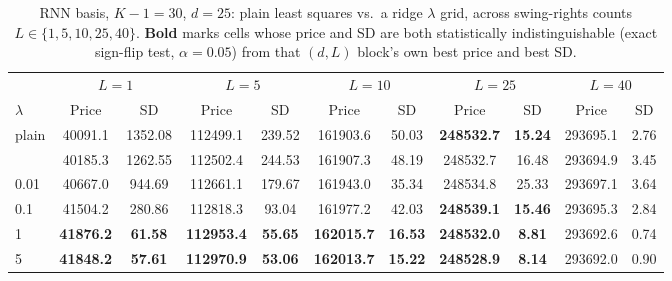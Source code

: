 \begin{table}[htbp]
\caption{\label{tab:rnn_ridge_lambda_L_sweep_K30_d25}RNN basis, $K-1=30$, $d=25$: plain least squares vs.\ a ridge $\lambda$ grid, across swing-rights counts $L \in \{1,5,10,25,40\}$. \textbf{Bold} marks cells whose price and SD are both statistically indistinguishable (exact sign-flip test, $\alpha=0.05$) from that $(d,L)$ block's own best price and best SD.}
\scriptsize
\setlength{\tabcolsep}{3pt}
\centering
\begin{tabular}[t]{lcccccccccc}
\toprule
\multicolumn{1}{c}{ } & \multicolumn{2}{c}{$L = 1$} & \multicolumn{2}{c}{$L = 5$} & \multicolumn{2}{c}{$L = 10$} & \multicolumn{2}{c}{$L = 25$} & \multicolumn{2}{c}{$L = 40$} \\
\cmidrule(l{3pt}r{3pt}){2-3} \cmidrule(l{3pt}r{3pt}){4-5} \cmidrule(l{3pt}r{3pt}){6-7} \cmidrule(l{3pt}r{3pt}){8-9} \cmidrule(l{3pt}r{3pt}){10-11}
$\lambda$ & Price & SD & Price & SD & Price & SD & Price & SD & Price & SD\\
\midrule
plain & 40091.1 & 1352.08 & 112499.1 & 239.52 & 161903.6 & 50.03 & \textbf{248532.7} & \textbf{15.24} & 293695.1 & 2.76\\
\addlinespace
0.001 & 40185.3 & 1262.55 & 112502.4 & 244.53 & 161907.3 & 48.19 & 248532.7 & 16.48 & 293694.9 & 3.45\\
0.01 & 40667.0 & 944.69 & 112661.1 & 179.67 & 161943.0 & 35.34 & 248534.8 & 25.33 & 293697.1 & 3.64\\
0.1 & 41504.2 & 280.86 & 112818.3 & 93.04 & 161977.2 & 42.03 & \textbf{248539.1} & \textbf{15.46} & 293695.3 & 2.84\\
1 & \textbf{41876.2} & \textbf{61.58} & \textbf{112953.4} & \textbf{55.65} & \textbf{162015.7} & \textbf{16.53} & \textbf{248532.0} & \textbf{8.81} & 293692.6 & 0.74\\
5 & \textbf{41848.2} & \textbf{57.61} & \textbf{112970.9} & \textbf{53.06} & \textbf{162013.7} & \textbf{15.22} & \textbf{248528.9} & \textbf{8.14} & 293692.0 & 0.90\\
\bottomrule
\end{tabular}
\end{table}

